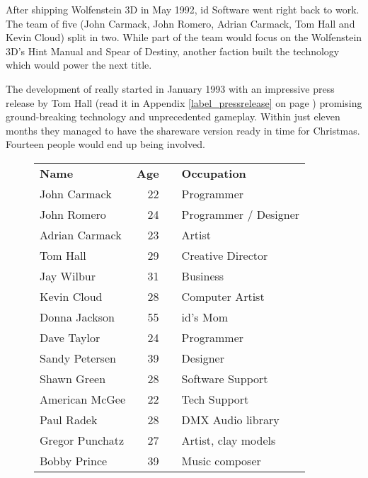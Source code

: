 \vspace{-5pt}
After shipping Wolfenstein 3D in May 1992, id Software went right back to work. The team of five (John Carmack, John Romero, Adrian Carmack, Tom Hall and Kevin Cloud) split in two. While part of the team would focus on the Wolfenstein 3D's Hint Manual and Spear of Destiny, another faction built the technology which would power the next title.\\
\par
The development of \doom{} really started in January 1993 with an impressive press release by Tom Hall (read it in Appendix \ref{label_pressrelease} on page \pageref{label_pressrelease}) promising ground-breaking technology and unprecedented gameplay. Within just eleven months they managed to have the shareware version ready in time for Christmas. Fourteen people would end up being involved.\\
\par
 \begin{figure}[H]
\centering  
\begin{tabularx}{\textwidth}{L{0.3} R{0.2} L{0.1} L{0.4}  }
  \textbf{Name} &  \textbf{Age} & &\textbf{Occupation} \\
   John Carmack & 22 &  &Programmer\\
   John Romero & 24 &  &Programmer / Designer\\
   Adrian Carmack\protect\footnotemark & 23 &  &Artist\\
   Tom Hall\protect\footnotemark  & 29 &  &Creative Director\\
   Jay Wilbur & 31 &  &Business\\
   Kevin Cloud& 28 &  &Computer Artist\\
   Donna Jackson & 55 & &id's Mom\\   
   Dave Taylor & 24 & &Programmer\\
   Sandy Petersen & 39 & &Designer\\
   Shawn Green & 28 & &Software Support\\
   American McGee & 22 & &Tech Support\\
   Paul Radek & 28 & &DMX Audio library\\
   Gregor Punchatz & 27 & &Artist, clay models\\
   Bobby Prince & 39 & & Music composer\\
\end{tabularx}
\label{fig:Id Software team}
\end{figure}
\addtocounter{footnote}{-1}



